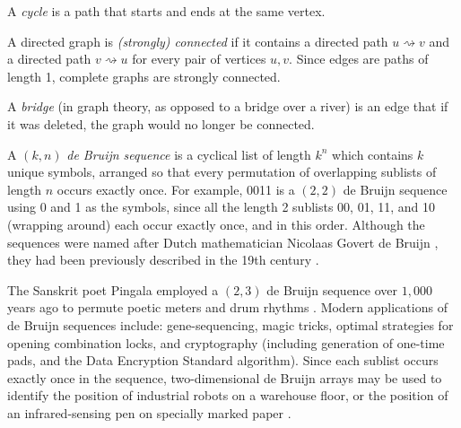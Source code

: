 \documentclass[prodmode,acmtecs]{acmsmall} %
\begin{document}
A \emph{cycle\/} is a path that starts and ends at the same vertex.

A directed graph is \emph{(strongly) connected\/} if it contains a directed path $u \rightsquigarrow v$ and a directed path $v \rightsquigarrow u$ for every pair of vertices $u,v$. Since edges are paths of length 1, complete graphs are strongly connected.

A \emph{bridge}  (in graph theory, as opposed to a bridge over a river) is an edge that if it was deleted, the graph would no longer be connected.


A $(k,n)$ \emph{de Bruijn sequence\/} is a cyclical list of length $k^n$ which contains $k$ unique symbols, arranged so that every permutation of overlapping sublists of length $n$ occurs exactly once. For example, 0011 is a $(2,2)$ de Bruijn sequence using 0 and 1 as the symbols, since all the length 2 sublists 00, 01, 11, and 10 (wrapping around) each occur exactly once, and in this order.
Although the sequences were named after Dutch mathematician Nicolaas Govert de Bruijn \cite{debruijn}, %
they had been previously described in the  19th century \cite{fleury,sainte-marie}.

The Sanskrit poet Pingala employed a $(2,3)$ de Bruijn sequence over $1,000$ years ago to permute poetic meters and drum rhythms \cite{hall,knuth4a}. Modern applications of de Bruijn sequences include: gene-sequencing, magic tricks, optimal strategies for opening combination locks, and cryptography (including generation of one-time pads, and the Data Encryption Standard algorithm). Since each sublist occurs exactly once in the sequence, two-dimensional de Bruijn arrays may be used to identify the position of industrial robots on a warehouse floor, or the position of an infrared-sensing pen on specially marked paper \cite{diaconis}.
\end{document}
